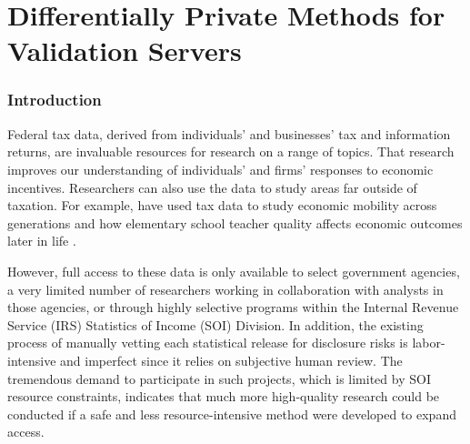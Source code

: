 
\fancyfoot{}



\part{Differentially Private Methods for Validation Servers}

\section{Introduction}\label{sec:intro}

Federal tax data, derived from individuals' and businesses' tax and information returns, are invaluable resources for research on a range of topics. That research improves our understanding of individuals' and firms' responses to economic incentives. Researchers can also use the data to study areas far outside of taxation. For example, \citet{chetty2014measuring} have used tax data to study economic mobility across generations and how elementary school teacher quality affects economic outcomes later in life \citep{chetty2011does}.

However, full access to these data is only available to select government agencies, a very limited number of researchers working in collaboration with analysts in those agencies, or through highly selective programs within the Internal Revenue Service (IRS) Statistics of Income (SOI) Division. In addition, the existing process of manually vetting each statistical release for disclosure risks is labor-intensive and imperfect since it relies on subjective human review. The tremendous demand to participate in such projects, which is limited by SOI resource constraints, indicates that much more high-quality research could be conducted if a safe and less resource-intensive method were developed to expand access.

